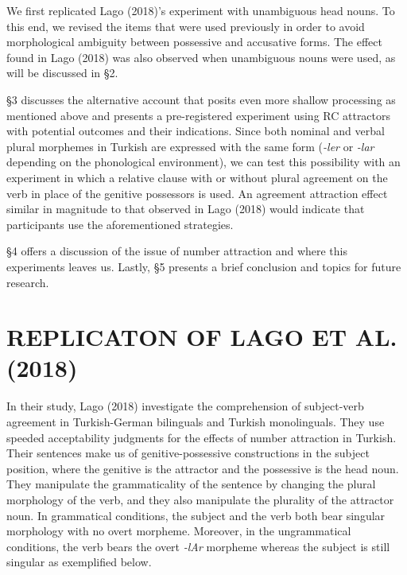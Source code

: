 \documentclass[11pt,a4paper]{article}
\begin{document}
We first replicated Lago (2018)'s experiment with unambiguous head
nouns. To this end, we revised the items that were used previously in
order to avoid morphological ambiguity between possessive and accusative
forms. The effect found in Lago (2018) was also observed when
unambiguous nouns were used, as will be discussed in \S 2.

\S 3 discusses the alternative account that posits even more shallow
processing as mentioned above and presents a pre-registered experiment
using RC attractors with potential outcomes and their indications. Since
both nominal and verbal plural morphemes in Turkish are expressed with
the same form (\emph{-ler} or \emph{-lar} depending on the phonological
environment), we can test this possibility with an experiment in which a
relative clause with or without plural agreement on the verb in place of
the genitive possessors is used. An agreement attraction effect similar
in magnitude to that observed in Lago (2018) would indicate that
participants use the aforementioned strategies.

\S 4 offers a discussion of the issue of number attraction and where
this experiments leaves us. Lastly, \S 5 presents a brief conclusion and
topics for future research.

\section{REPLICATON OF LAGO ET AL.
(2018)}\label{replicaton-of-lago-et-al.-2018}

In their study, Lago (2018) investigate the comprehension of
subject-verb agreement in Turkish-German bilinguals and Turkish
monolinguals. They use speeded acceptability judgments for the effects
of number attraction in Turkish. Their sentences make us of
genitive-possessive constructions in the subject position, where the
genitive is the attractor and the possessive is the head noun. They
manipulate the grammaticality of the sentence by changing the plural
morphology of the verb, and they also manipulate the plurality of the
attractor noun. In grammatical conditions, the subject and the verb both
bear singular morphology with no overt morpheme. Moreover, in the
ungrammatical conditions, the verb bears the overt \emph{-lAr} morpheme
whereas the subject is still singular as exemplified below.
\end{document}
